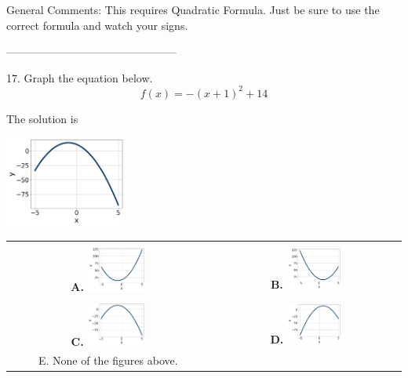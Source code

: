 \documentclass{article}[14pt]
\begin{document}
General Comments: This requires Quadratic Formula. Just be sure to use the correct formula and watch your signs.

-----------------------------------------------

17. Graph the equation below.
$$ f(x) = -(x+1)^2 + 14 $$ 

 
 The solution is  
 \begin{center} \includegraphics[width=0.3\textwidth]{../Figures/quadraticEquationToGraphCA.png} \end{center}\begin{tabular}{|c|c|} 
\hline 
 & \tabularnewline 
 \textbf{A.} \includegraphics[width=0.3\textwidth]{../Figures/quadraticEquationToGraphAA.png} & \textbf{B.} \includegraphics[width=0.3\textwidth]{../Figures/quadraticEquationToGraphBA.png} \tabularnewline 
\hline 
 & \tabularnewline 
 \textbf{C.} \includegraphics[width=0.3\textwidth]{../Figures/quadraticEquationToGraphCA.png} & \textbf{D.} \includegraphics[width=0.3\textwidth]{../Figures/quadraticEquationToGraphDA.png} \tabularnewline 
\hline 
 E. None of the figures above. & \tabularnewline 
\hline 
 \end{tabular} 
 
\end{document}
